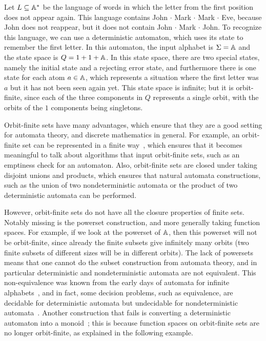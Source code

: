 \documentclass[a4paper,UKenglish,cleveref, autoref, numberwithinsect, thm-restate]{lipics-v2021}
\begin{document}
\begin{example}\label{ex:first-letter-repeats}
    Let  $L \subseteq \mathbb A^*$ be the language of  words in which the letter from the first position does not appear again. This language contains John $\cdot$ Mark $\cdot$ Mark $\cdot$ Eve, because John does not reappear, but it does not contain John $\cdot$ Mark $\cdot$ John. To recognize this language, we can use a deterministic automaton, which uses its state to remember the first letter. In this automaton, the input alphabet is $\Sigma = \mathbb A$ and  the state space is $Q = 1 + 1 + \mathbb A$. In this state space, there are two special states, namely the initial state and a rejecting error state, and furthermore there is one state for each atom $a \in \mathbb A$, which represents a situation where the first letter was $a$ but it has not been seen again yet. This state space is infinite; but it is orbit-finite, since each of the three components in $Q$ represents a single orbit, with the orbits of the $1$ components being singletons.\exampleend
\end{example}

Orbit-finite sets have many advantages, which ensure that they are a good setting for automata theory, and discrete mathematics in general. For example, an orbit-finite set can be represented in a finite way~\cite{bojanczyk_slightly2018}, which ensures that it becomes meaningful to talk about algorithms that input orbit-finite sets, such as an emptiness check for an automaton. Also, orbit-finite sets are closed under taking disjoint unions and products, which ensures that natural automata constructions, such as the union of two nondeterministic automata or the product of two deterministic automata can be performed.

However, orbit-finite sets do not have all the closure properties of finite sets. Notably missing is the powerset construction, and more generally taking function spaces. For example, if we look at the powerset of $\mathbb A$, then this powerset will not be orbit-finite, since already the finite subsets give infinitely many orbits (two finite subsets of different sizes will be in different orbits). The lack of powersets means that one cannot do the subset construction from automata theory, and in particular deterministic and nondeterministic automata are not equivalent. This non-equivalence was known from the early days of automata for infinite alphabets~\cite{kaminskiFiniteMemoryAutomata1994}, and in fact, some decision problems, such as equivalence, are decidable for deterministic automata but undecidable for nondeterministic automata~\cite{nevenFiniteStateMachines2004}. Another construction that fails is converting a deterministic automaton into a monoid~\cite[p.~221]{bojanczykNominalMonoids2013}; this is because function spaces on orbit-finite sets are no longer orbit-finite, as explained in the following example. 
\end{document}
